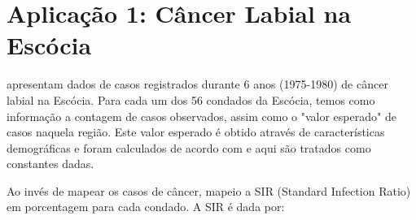\chapter{Aplicação 1: Câncer Labial na Escócia}\label{chap:lip}

\cite{Clayton1987} apresentam dados de casos registrados durante 6 anos (1975-1980) de câncer labial na Escócia.
Para cada um dos 56 condados da Escócia, temos como informação a contagem de casos observados, assim como o "valor esperado" de casos naquela região.
Este valor esperado é obtido através de características demográficas e foram calculados de acordo com \cite{Mantel1968} e aqui são tratados como constantes dadas. 

Ao invés de mapear os casos de câncer, mapeio a SIR (Standard Infection Ratio) em porcentagem para cada condado.
A SIR é dada por:


